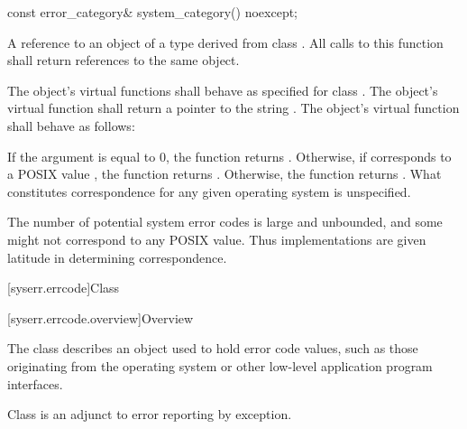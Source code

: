 %
\begin{itemdecl}
const error_category& system_category() noexcept;
\end{itemdecl}

\begin{itemdescr}
\pnum
\returns
A reference to an object of a type derived from class .
All calls to this function shall return references to the same object.

\pnum
\remarks
The object's  virtual functions shall behave as specified for
class . The object's  virtual function shall return a
pointer to the string . The object's 
virtual function shall behave as follows:

If the argument  is equal to 0,
the function returns .
Otherwise,
if  corresponds to a POSIX  value ,
the function returns .
Otherwise, the function returns .
What constitutes correspondence for any given operating system is unspecified.
\begin{note}
The number of potential system error codes is large
and unbounded, and some might not correspond to any POSIX  value. Thus
implementations are given latitude in determining correspondence.
\end{note}
\end{itemdescr}

[syserr.errcode]{Class }

[syserr.errcode.overview]{Overview}

\pnum
The class  describes an object used to hold error code
values, such as those originating from the operating system or other low-level
application program interfaces.
\begin{note}
Class  is an
adjunct to error reporting by exception.
\end{note}


